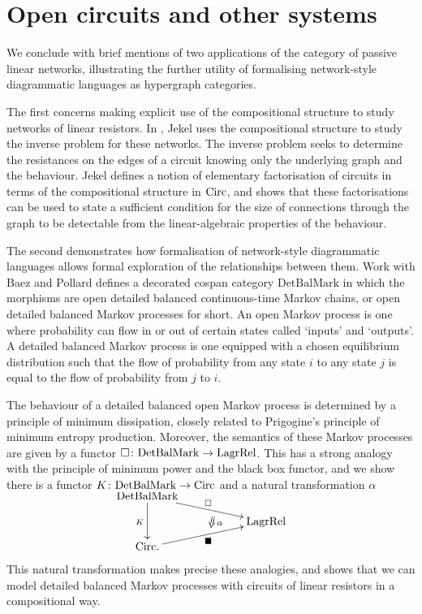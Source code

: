 \section{Open circuits and other systems}

We conclude with brief mentions of two applications of the category of passive
linear networks, illustrating the further utility of formalising network-style
diagrammatic languages as hypergraph categories.

The first concerns making explicit use of the compositional structure to study
networks of linear resistors. In \cite{Jek}, Jekel uses the compositional
structure to study the inverse problem for these networks. The inverse problem
seeks to determine the resistances on the edges of a circuit knowing only the
underlying graph and the behaviour. Jekel defines a notion of elementary
factorisation of circuits in terms of the compositional structure in $\mathrm{Circ}$,
and shows that these factorisations can be used to state a sufficient condition
for the size of connections through the graph to be detectable from the
linear-algebraic properties of the behaviour.

The second demonstrates how formalisation of network-style diagrammatic
languages allows formal exploration of the relationships between them. Work with
Baez and Pollard \cite{BFP,Pol16} defines a decorated cospan category
$\mathrm{DetBalMark}$ in which the morphisms are open detailed balanced
continuous-time Markov chains, or open detailed balanced Markov processes for
short.  An open Markov process is one where probability can flow in or out of
certain states called `inputs' and `outputs'. A detailed balanced Markov process
is one equipped with a chosen equilibrium distribution such that the flow of
probability from any state $i$ to any state $j$ is equal to the flow of
probability from $j$ to $i$. 

The behaviour of a detailed balanced open Markov process is determined by a
principle of minimum dissipation, closely related to Prigogine's principle of
minimum entropy production. Moreover, the semantics of these Markov processes are
given by a functor $\square{\colon} \mathrm{DetBalMark} \to \mathrm{LagrRel}$. This has a strong analogy with the principle of
minimum power and the black box functor, and we show there is a functor $K{\colon}
\mathrm{DetBalMark} \to \mathrm{Circ}$ and a natural transformation $\alpha$
\[
  \xymatrixrowsep{2ex}
  \xymatrix{
    \mathrm{DetBalMark} \ar[dd]_{K} \ar[drr]^{\square}  \\
    &\twocell \omit{_\:\alpha}& \mathrm{LagrRel} \\
    \Circ. \ar[urr]_{\blacksquare} 
  }
\]
This natural transformation makes precise these analogies, and shows that we can
model detailed balanced Markov processes with circuits of linear resistors in a
compositional way.

